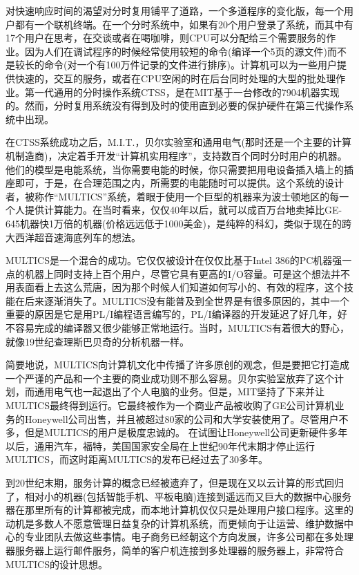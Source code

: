 	对快速响应时间的渴望对分时复用铺平了道路，一个多道程序的变化版，每一个用户都有一个联机终端。在一个分时系统中，如果有20个用户登录了系统，而其中有17个用户在思考，在交谈或者在喝咖啡，则CPU可以分配给三个需要服务的作业。因为人们在调试程序的时候经常使用较短的命令(编译一个5页的源文件)而不是较长的命令(对一个有100万件记录的文件进行排序)。计算机可以为一些用户提供快速的，交互的服务，或者在CPU空闲的时在后台同时处理的大型的批处理作业。第一代通用的分时操作系统CTSS，是在MIT基于一台修改的7904机器实现的。然而，分时复用系统没有得到及时的使用直到必要的保护硬件在第三代操作系统中出现。
	
	在CTSS系统成功之后，M.I.T.，贝尔实验室和通用电气(那时还是一个主要的计算机制造商)，决定着手开发“计算机实用程序”，支持数百个同时分时用户的机器。他们的模型是电能系统，当你需要电能的时候，你只需要把用电设备插入墙上的插座即可，于是，在合理范围之内，所需要的电能随时可以提供。这个系统的设计者，被称作“MULTICS”系统，着眼于使用一个巨型的机器来为波士顿地区的每一个人提供计算能力。在当时看来，仅仅40年以后，就可以成百万台地卖掉比GE-645机器快1万倍的机器(价格远远低于1000美金)，是纯粹的科幻，类似于现在的跨大西洋超音速海底列车的想法。
	
	MULTICS是一个混合的成功。它仅仅被设计在仅仅比基于Intel 386的PC机器强一点的机器上同时支持上百个用户，尽管它具有更高的I/O容量。可是这个想法并不用表面看上去这么荒唐，因为那个时候人们知道如何写小的、有效的程序，这个技能在后来逐渐消失了。MULTICS没有能普及到全世界是有很多原因的，其中一个重要的原因是它是用PL/I编程语言编写的，PL/I编译器的开发延迟了好几年，好不容易完成的编译器又很少能够正常地运行。当时，MULTICS有着很大的野心，就像19世纪查理斯巴贝奇的分析机器一样。
	
	简要地说，MULTICS向计算机文化中传播了许多原创的观念，但是要把它打造成一个严谨的产品和一个主要的商业成功则不那么容易。贝尔实验室放弃了这个计划，而通用电气也一起退出了个人电脑的业务。但是，MIT坚持了下来并让MULTICS最终得到运行。它最终被作为一个商业产品被收购了GE公司计算机业务的Honeywell公司出售，并且被超过80家的公司和大学安装使用了。尽管用户不多，但是MULTICS的用户是极度忠诚的。
	在试图让Honeywell公司更新硬件多年以后，通用汽车，福特，美国国家安全局在上世纪90年代末期才停止运行MULTICS，而这时距离MULTICS的发布已经过去了30多年。
	
	到20世纪末期，服务计算的概念已经被遗弃了，但是现在又以云计算的形式回归了，相对小的机器(包括智能手机、平板电脑)连接到遥远而又巨大的数据中心服务器在那里所有的计算都被完成，而本地计算机仅仅只是处理用户接口程序。这里的动机是多数人不愿意管理日益复杂的计算机系统，而更倾向于让运营、维护数据中心的专业团队去做这些事情。电子商务已经朝这个方向发展，许多公司都在多处理器服务器上运行邮件服务，简单的客户机连接到多处理器的服务器上，非常符合MULTICS的设计思想。
	
